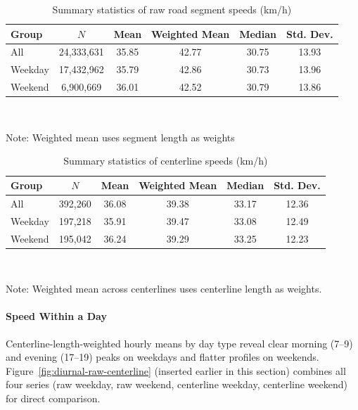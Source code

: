 \documentclass[12pt]{article}
\begin{document}
	\begin{table}[h!]
		\centering
		\caption{Summary statistics of raw road segment speeds (km/h)}
		\label{tab:raw-speed-stats}
		\begin{tabular}{lccccc}
			\toprule
			Group & $N$ & Mean & Weighted Mean & Median & Std. Dev. \\
			\midrule
			All & 24,333,631 & 35.85 & 42.77 & 30.75 & 13.93 \\
			Weekday & 17,432,962 & 35.79 & 42.86 & 30.73 & 13.96 \\
			Weekend & 6,900,669 & 36.01 & 42.52 & 30.79 & 13.86 \\
			\bottomrule
		\end{tabular} \\
	\vspace{0.3em}
	{\footnotesize\raggedright Note: Weighted mean uses segment length as weights
	}
	\end{table}
	
	\begin{table}[h!]
		\centering
		\caption{Summary statistics of centerline speeds (km/h)}
		\label{tab:centerline-speed-stats}
		\begin{tabular}{lccccc}
			\toprule
			Group & $N$ & Mean & Weighted Mean & Median & Std. Dev. \\
			\midrule
			All      & 392{,}260 & 36.08 & 39.38 & 33.17 & 12.36 \\
			Weekday & 197{,}218 & 35.91 & 39.47 & 33.08 & 12.49 \\
			Weekend & 195{,}042 & 36.24 & 39.29 & 33.25 & 12.23 \\
			\bottomrule
		\end{tabular} \\
		\vspace{0.3em}
		{\footnotesize\raggedright
			Note: Weighted mean across centerlines uses centerline length as weights.
		}
	\end{table}
	
	\paragraph{Speed Within a Day}
	
	Centerline-length-weighted hourly means by day type reveal clear morning (7--9) and evening (17--19) peaks on weekdays and flatter profiles on weekends. Figure~\ref{fig:diurnal-raw-centerline} (inserted earlier in this section) combines all four series (raw weekday, raw weekend, centerline weekday, centerline weekend) for direct comparison.
	
\end{document}

